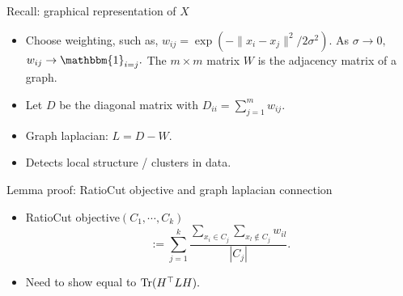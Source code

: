 \documentclass[final]{beamer}
\begin{document}
\begin{frame}{Recall: graphical representation of $X$}
	\begin{itemize}
		\item Choose weighting, such as, $w_{ij} = \exp(-\|x_i - x_j\|^2/2\sigma^2).$ As $\sigma \to 0,$ $w_{ij} \to \mathbbm{1}_{i=j}.$ The $m \times m$ matrix $W$ is the adjacency matrix of a graph.
		\pause
		\item Let $D$ be the diagonal matrix with $D_{ii} = \sum_{j=1}^m w_{ij}.$
		\pause 
		\item Graph laplacian: $L = D - W.$
		\pause 
		\item Detects local structure / clusters in data.

	\end{itemize}

\end{frame}
\begin{frame}{Lemma proof: RatioCut objective and graph laplacian connection}
	\begin{itemize}
		\item RatioCut objective$(C_1,\cdots, C_k)$
			$$ := \sum_{j=1}^k \dfrac{\sum_{x_i \in C_j} \sum_{x_l \notin C_j} w_{il}}{|C_j|}.$$

	\pause
	\item Need to show equal to ${\rm Tr}(H^\top L H).$
	\end{itemize}

\end{frame}
\end{document}
